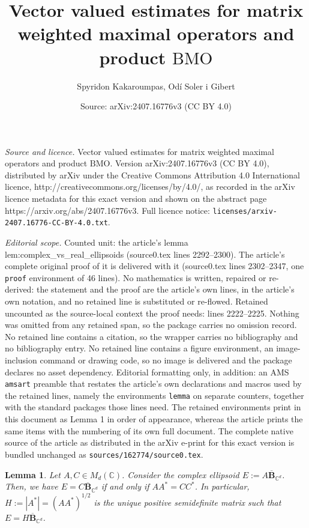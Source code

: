 \documentclass[10pt,a4paper]{amsart}
\title{Vector valued estimates for matrix weighted maximal operators and product \texorpdfstring{$\mathrm{BMO}$}{BMO}}
\author{Spyridon Kakaroumpas, Od\'i Soler i Gibert}
\date{Source: arXiv:2407.16776v3 (CC BY 4.0)}
\newtheorem{lemma}{Lemma}
\newcommand{\complex}{\mathbb{C}}
\begin{document}
\maketitle

\noindent\emph{Source and licence.} Vector valued estimates for matrix weighted maximal operators and product \texorpdfstring{$\mathrm{BMO}$}{BMO}. Version arXiv:2407.16776v3 (CC BY 4.0), distributed by arXiv under the Creative Commons Attribution 4.0 International licence, http://creativecommons.org/licenses/by/4.0/, as recorded in the arXiv licence metadata for this exact version and shown on the abstract page https://arxiv.org/abs/2407.16776v3. Full licence notice: \texttt{licenses/arxiv-2407.16776-CC-BY-4.0.txt}.\par\smallskip

\noindent\textit{Editorial scope.} Counted unit: the article's lemma lem:complex\_vs\_real\_ellipsoids (source0.tex lines 2292--2300). The article's complete original proof of it is delivered with it (source0.tex lines 2302--2347, one \texttt{proof} environment of 46 lines). No mathematics is written, repaired or re-derived: the statement and the proof are the article's own lines, in the article's own notation, and no retained line is substituted or re-flowed.  Retained uncounted as the source-local context the proof needs: lines 2222--2225.  Nothing was omitted from any retained span, so the package carries no omission record.  No retained line contains a citation, so the wrapper carries no bibliography and no bibliography entry.  No retained line contains a figure environment, an image-inclusion command or drawing code, so no image is delivered and the package declares no asset dependency.  Editorial formatting only, in addition: an AMS \texttt{amsart} preamble that restates the article's own declarations and macros used by the retained lines, namely the environments \texttt{lemma} on separate counters, together with the standard packages those lines need.  The retained environments print in this document as Lemma 1 in order of appearance, whereas the article prints the same items with the numbering of its own full document.  The complete native source of the article as distributed in the arXiv e-print for this exact version is bundled unchanged as \texttt{sources/162774/source0.tex}.
    \begin{lemma}
        \label{lem:matrix_ellipsoid}
        Let $A,C\in M_{d}(\complex)$. Consider the complex ellipsoid $E:=A\mathbf{\overline{B}}_{\complex^{d}}$. Then, we have $E=C\mathbf{\overline{B}}_{\complex^{d}}$ if and only if $AA^{\ast}=CC^{\ast}$. In particular, $H := |A^{\ast}| = (AA^{\ast})^{1/2}$ is the unique positive semidefinite matrix such that $E=H\mathbf{\overline{B}}_{\complex^d}$.
    \end{lemma}
\end{document}
